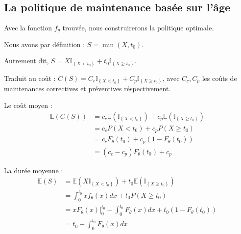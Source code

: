 \documentclass[10pt,a4paper]{article}
\begin{document}
\subsection{La politique de maintenance basée sur l'âge}

Avec la fonction $f_\theta$ trouvée, nous construirerons la politique optimale.

Nous avons par définition : $S = \min \left( {X,{t_0}} \right)$.

Autrement dit, $S = X{\mathbb{I}_{\left\{ {X < {t_0}} \right\}}} + {t_0}{\mathbb{I}_{\left\{ {X \geqslant {t_0}} \right\}}}$.

Traduit au coût : $C\left( S \right) = {C_c}{\mathbb{I}_{\left\{ {X < {t_0}} \right\}}} + {C_p}{\mathbb{I}_{\left\{ {X \geqslant {t_0}} \right\}}}$, avec $C_c, C_p$ les coûts de maintenances correctives et préventives réspectivement.

Le coût moyen :
\begin{align}
    \label{coutmoy}
    \mathbb{E}\left( {C\left( S \right)} \right) & = {c_c}\mathbb{E}\left( {{\mathbb{I}_{\left\{ {X < {t_0}} \right\}}}} \right) + {c_p}\mathbb{E}\left( {{\mathbb{I}_{\left\{ {X \geqslant {t_0}} \right\}}}} \right) \nonumber \\
    & = {c_c}P\left( {X < {t_0}} \right) + {c_p}P\left( {X \geqslant {t_0}} \right) \nonumber \\
    & = {c_c}{F_\theta }\left( {{t_0}} \right) + {c_p}\left( {1 - {F_\theta }\left( {{t_0}} \right)} \right) \nonumber \\
    & = \left( {{c_c} - {c_p}} \right){F_\theta }\left( {{t_0}} \right) + {c_p}
\end{align}

La durée moyenne :
\begin{align}
    \label{dureemoy}
    \mathbb{E}\left( S \right) & = \mathbb{E}\left( {X{\mathbb{I}_{\left\{ {X < {t_0}} \right\}}}} \right) + {t_0}\mathbb{E}\left( {{\mathbb{I}_{\left\{ {X \geqslant {t_0}} \right\}}}} \right)\nonumber\\
    & = \int_0^{{t_0}} {x{f_\theta }\left( x \right)dx}  + {t_0}P\left( {X \geqslant {t_0}} \right) \nonumber \\
    & = x{F_\theta }\left( x \right)|_0^{{t_0}} - \int_0^{{t_0}} {{F_\theta }\left( x \right)dx}  + {t_0}\left( {1 - {F_\theta }\left( {{t_0}} \right)} \right) \nonumber \\
    & = {t_0} - \int_0^{{t_0}} {{F_\theta }\left( x \right)dx}
\end{align}
\end{document}
